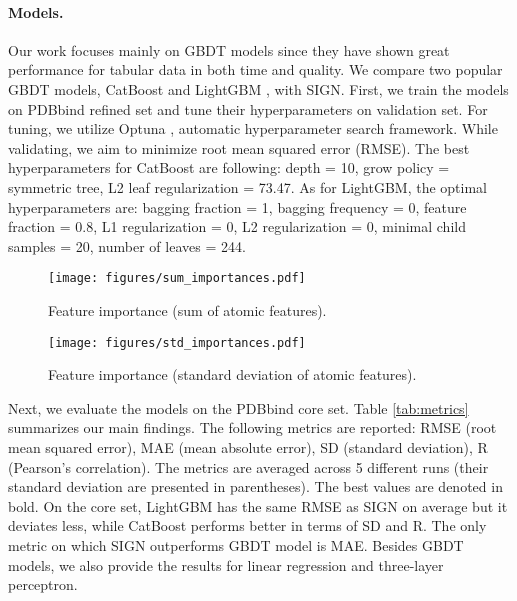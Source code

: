 \documentclass[nohyperref]{article}
\theoremstyle{plain}
\theoremstyle{definition}
\theoremstyle{remark}
\begin{document}
\paragraph{Models.}
Our work focuses mainly on GBDT models since they have shown great performance for tabular data in both time and quality. We compare two popular GBDT models, CatBoost \cite{catboost} and LightGBM \cite{lightgbm}, with SIGN.
First, we train the models on PDBbind refined set and tune their hyperparameters on validation set. For tuning, we utilize Optuna \cite{optuna}, automatic hyperparameter search framework. While validating, we aim to minimize root mean squared error (RMSE). The best hyperparameters for CatBoost are following: depth = 10, grow policy = symmetric tree, L2 leaf regularization = 73.47. As for LightGBM, the optimal hyperparameters are: bagging fraction = 1, bagging frequency = 0, feature fraction = 0.8, L1 regularization = 0, L2 regularization = 0, minimal child samples = 20, number of leaves = 244.
\begin{figure}[t]
\vskip 0.2in
\begin{center}
\centerline{\texttt{[image: figures/sum\_importances.pdf]}}
\caption{Feature importance (sum of atomic features).}
\label{fig:sum_importances}
\end{center}
\vskip -0.2in
\end{figure}

\begin{figure}[t]
\vskip 0.2in
\begin{center}
\centerline{\texttt{[image: figures/std\_importances.pdf]}}
\caption{Feature importance (standard deviation of atomic features).}
\label{fig:std_importances}
\end{center}
\vskip -0.2in
\end{figure}

Next, we evaluate the models on the PDBbind core set. Table \ref{tab:metrics} summarizes our main findings. The following metrics are reported: RMSE (root mean squared error), MAE (mean absolute error), SD (standard deviation), R (Pearson's correlation). The metrics are averaged across 5 different runs (their standard deviation are presented in parentheses). The best values are denoted in bold. On the core set, LightGBM has the same RMSE as SIGN on average but it deviates less, while CatBoost performs better in terms of SD and R. The only metric on which SIGN outperforms GBDT model is MAE. Besides GBDT models, we also provide the results for linear regression and three-layer perceptron.
\end{document}
